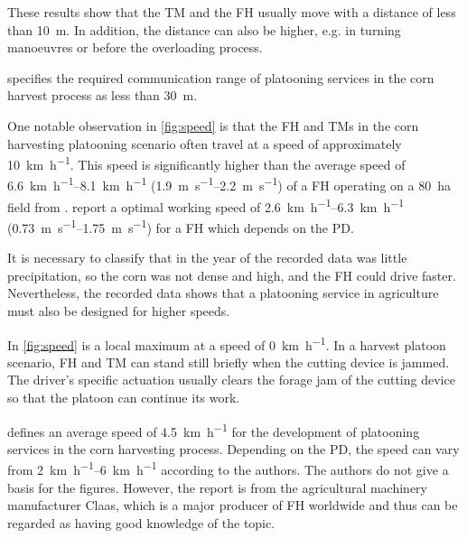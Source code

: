 These results show that the \ac{TM} and the \ac{FH} usually move with a distance of less than \SI{10}{\metre}.
In addition, the distance can also be higher, e.g. in turning manoeuvres or before the overloading process.

\textcite{smolnik_5g_2020} specifies the required communication range of platooning services in the corn harvest process
as less than \SI{30}{\metre}.

One notable observation in \autoref{fig:speed} is that the \ac{FH} and \ac{TM}s in the corn harvesting platooning scenario
often travel at a speed of approximately \SI{10}{\kilo\metre\per\hour}.
This speed is significantly higher than the average speed of \SIrange{6.6}{8.1}{\kilo\metre\per\hour} (\SIrange{1.9}{2.2}{\metre\per\second}) of a \ac{FH} operating on a \SI{80}{\hectare} field from \cite{faustzahlen2018}.
\textcite{nedelcu_influence_2020} report a optimal working speed of \SIrange{2.6}{6.3}{\kilo\metre\per\hour} (\SIrange{0.73}{1.75}{\metre\per\second}) for a \ac{FH} which depends on the \ac{PD}.


It is necessary to classify that in the year of the recorded data was little precipitation, so the corn was not dense and high,
and the \ac{FH} could drive faster.
Nevertheless, the recorded data shows that a platooning service in agriculture must also be designed for higher speeds.

In \autoref{fig:speed} is a local maximum at a speed of \SI{0}{\kilo\metre\per\hour}.
In a harvest platoon scenario, \ac{FH} and \ac{TM} can stand still briefly when the cutting device is jammed.
The driver's specific actuation usually clears the forage jam of the cutting device so that the platoon can continue its work.

\textcite{smolnik_5g_2020} defines an average speed of \SI{4.5}{\kilo\metre\per\hour} for the development of platooning
services in the corn harvesting process.
Depending on the \ac{PD}, the speed can vary from \SIrange{2}{6}{\kilo\metre\per\hour} according to the authors.
The authors do not give a basis for the figures.
However, the report is from the agricultural machinery manufacturer Claas,
which is a major producer of \ac{FH} worldwide and thus can be regarded as having good knowledge of the topic.

